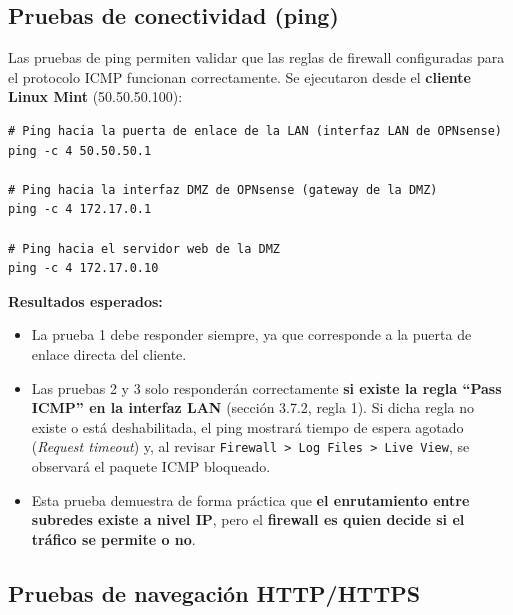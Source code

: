 \documentclass{article}
\providecommand{\tightlist}{%
  \setlength{\itemsep}{0pt}\setlength{\parskip}{0pt}}
\renewcommand{\_}{\oldunderscore\hskip0pt\relax}
\begin{document}
\hypertarget{pruebas-de-conectividad-ping}{%
\subsection{Pruebas de conectividad
(ping)}\label{pruebas-de-conectividad-ping}}

Las pruebas de ping permiten validar que las reglas de firewall
configuradas para el protocolo ICMP funcionan correctamente. Se
ejecutaron desde el \textbf{cliente Linux Mint} (50.50.50.100):

\begin{Verbatim}[fontsize=\footnotesize,frame=single,rulecolor=\color{codebg},fillcolor=\color{codebg},framesep=2mm,xleftmargin=1mm,xrightmargin=1mm,breaklines=true,breakanywhere=true,breaksymbolleft={},breaksymbolright={}]
# Ping hacia la puerta de enlace de la LAN (interfaz LAN de OPNsense)
ping -c 4 50.50.50.1

# Ping hacia la interfaz DMZ de OPNsense (gateway de la DMZ)
ping -c 4 172.17.0.1

# Ping hacia el servidor web de la DMZ
ping -c 4 172.17.0.10
\end{Verbatim}

\textbf{Resultados esperados:}

\begin{itemize}
\tightlist
\item
  La prueba 1 debe responder siempre, ya que corresponde a la puerta de
  enlace directa del cliente.
\item
  Las pruebas 2 y 3 solo responderán correctamente \textbf{si existe la
  regla ``Pass ICMP'' en la interfaz LAN} (sección 3.7.2, regla 1). Si
  dicha regla no existe o está deshabilitada, el ping mostrará tiempo de
  espera agotado (\emph{Request timeout}) y, al revisar
  \texttt{Firewall\ \textgreater{}\ Log\ Files\ \textgreater{}\ Live\ View},
  se observará el paquete ICMP bloqueado.
\item
  Esta prueba demuestra de forma práctica que \textbf{el enrutamiento
  entre subredes existe a nivel IP}, pero el \textbf{firewall es quien
  decide si el tráfico se permite o no}.
\end{itemize}

\hypertarget{pruebas-de-navegaciuxf3n-httphttps}{%
\subsection{Pruebas de navegación
HTTP/HTTPS}\label{pruebas-de-navegaciuxf3n-httphttps}}
\end{document}
